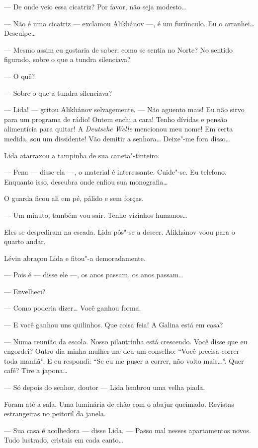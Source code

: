 --- De onde veio essa cicatriz? Por favor, não seja modesto\ldots{}

--- Não é uma cicatriz --- exclamou Alikhánov ---, é um furúnculo. Eu o
arranhei\ldots{} Desculpe\ldots{}

--- Mesmo assim eu gostaria de saber: como se sentia no Norte? No
sentido figurado, sobre o que a tundra silenciava?

--- O quê?

--- Sobre o que a tundra silenciava?

--- Lida! --- gritou Alikhánov selvagemente. --- Não aguento mais! Eu
não sirvo para um programa de rádio! Ontem enchi a cara! Tenho dívidas e
pensão alimentícia para quitar! A \emph{Deutsche Welle} mencionou meu
nome! Em certa medida, sou um dissidente! Vão demitir a senhora\ldots{}
Deixe"-me fora disso\ldots{}

Lida atarraxou a tampinha de sua caneta"-tinteiro.

--- Pena --- disse ela ---, o material é interessante. Cuide"-se. Eu
telefono. Enquanto isso, descubra onde enfiou sua monografia\ldots{}

O guarda ficou ali em pé, pálido e sem forças.

--- Um minuto, também vou sair. Tenho vizinhos humanos\ldots{}

Eles se despediram na escada. Lida pôs"-se a descer. Alikhánov voou para
o quarto andar.

\bigskip

Lévin abraçou Lida e fitou"-a demoradamente.

--- Pois é --- disse ele ---, os anos passam, os anos passam\ldots{}

--- Envelheci?

--- Como poderia dizer\ldots{} Você ganhou forma.

--- E você ganhou uns quilinhos. Que coisa feia! A Galina está em casa?

--- Numa reunião da escola. Nosso pilantrinha está crescendo. Você disse
que eu engordei? Outro dia minha mulher me deu um conselho: ``Você
precisa correr toda manhã''. E eu respondi: ``Se eu me puser a correr,
não volto mais\ldots{}''. Quer café? Tire a japona\ldots{}

--- Só depois do senhor, doutor --- Lida lembrou uma velha piada.

Foram até a sala. Uma luminária de chão com o abajur queimado. Revistas
estrangeiras no peitoril da janela.

--- Sua casa é acolhedora --- disse Lida. --- Passo mal nesses
apartamentos novos. Tudo lustrado, cristais em cada canto\ldots{}

